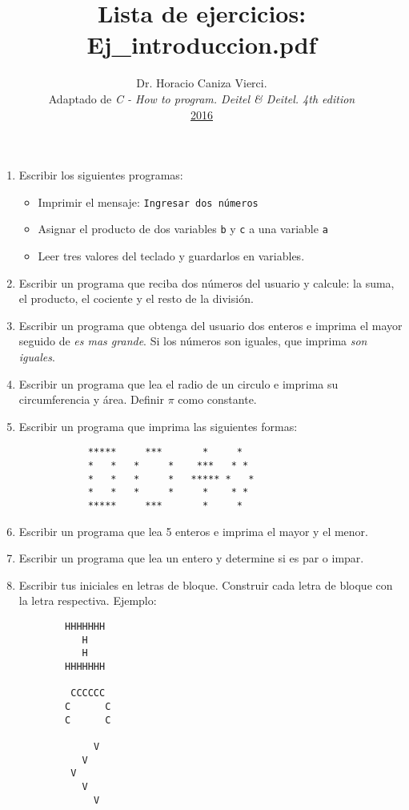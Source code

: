 \documentclass[12pt]{article}
\title{Lista de ejercicios: Ej\_introduccion.pdf}
\author{
    Dr. Horacio Caniza Vierci.\\ 
    Adaptado de \emph{C - How to program. Deitel \& Deitel. 4th edition}\\
        \underline{2016}
}
\date{}
\begin{document}
\maketitle

\begin{enumerate}
    \item Escribir los siguientes programas:
    \begin{itemize}
           \item Imprimir el mensaje: \texttt{Ingresar dos n\'umeros}
           \item Asignar el producto de dos variables \texttt{b} y \texttt{c} a una variable \texttt{a}
           \item Leer tres valores del teclado y guardarlos en variables.
    \end{itemize}
    \item Escribir un programa que reciba dos n\'umeros del usuario y calcule: la suma, el producto, el cociente y el resto de la divisi\'on.
    \item Escribir un programa que obtenga del usuario dos enteros e imprima el mayor seguido de \emph{es mas grande}. Si los n\'umeros son 
        iguales, que imprima \emph{son iguales}.
    \item Escribir un programa que lea el radio de un circulo e imprima su circumferencia y \'area. Definir $\pi$ como constante.
    \item Escribir un programa que imprima las siguientes formas:
        \begin{verbatim}
            *****     ***       *     *
            *   *   *     *    ***   * *
            *   *   *     *   ***** *   *
            *   *   *     *     *    * *  
            *****     ***       *     *
        \end{verbatim}
    \item Escribir un programa que lea 5 enteros e imprima el mayor y el menor.
    \item Escribir un programa que lea un entero y determine si es par o impar. 
    \item Escribir tus iniciales en letras de bloque. Construir cada letra de bloque con la letra 
        respectiva. Ejemplo:
        \begin{verbatim}
        HHHHHHH
           H
           H
        HHHHHHH

         CCCCCC
        C      C
        C      C

             V
           V
         V
           V
             V


\end{verbatim}
\end{enumerate}
\end{document}

